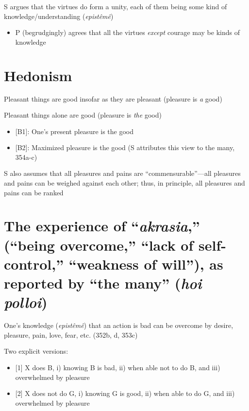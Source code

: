 \documentclass[11pt]{article}
\begin{document}
\noindent S argues that the virtues do form a unity, each of them being some kind of knowledge/understanding (\emph{epist\^{e}m\^{e}})

\begin{itemize}\item{P (begrudgingly) agrees that all the virtues \emph{except} courage may be kinds of knowledge}\end{itemize}

\section*{Hedonism}

\noindent [A] Pleasant things are good insofar as they are pleasant (pleasure is \emph{a} good)
\vspace*{2mm}

\noindent [B] Pleasant things alone are good (pleasure is \emph{the} good)

\begin{itemize}\item{[B1]: One's present pleasure is the good}\item{[B2]: Maximized pleasure is the good (S attributes this view to the many, 354a-c)}\end{itemize}
\vspace*{2mm}

\noindent S also assumes that all pleasures and pains are ``commensurable''---all pleasures and pains can be weighed against each other; thus, in principle, all pleasures and pains can be ranked

\section*{The experience of ``\emph{akrasia},'' (``being overcome,'' ``lack of self-control,'' ``weakness of will''), as reported by ``the many'' (\emph{hoi polloi})}

\noindent One's knowledge (\emph{epist\^{e}m\^{e}}) that an action is bad can be overcome by desire, pleasure, pain, love, fear, etc. (352b, d, 353c)
\vspace*{2mm}

\noindent Two explicit versions:

\begin{itemize}\item{[1] X does B, i) knowing B is bad, ii) when able not to do B, and iii) overwhelmed by pleasure}
\item{[2] X does not do G, i) knowing G is good, ii) when able to do G, and iii) overwhelmed by pleasure}\end{itemize}
\end{document}
